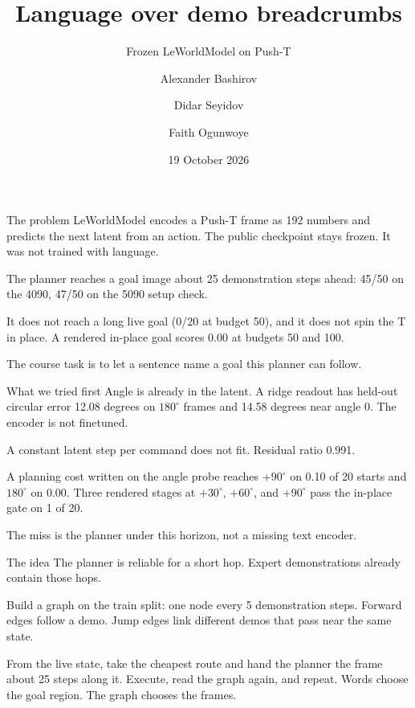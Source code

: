 \documentclass[aspectratio=169,11pt]{beamer}
\title{Language over demo breadcrumbs}
\subtitle{Frozen LeWorldModel on Push-T}
\author{Alexander Bashirov \and Didar Seyidov \and Faith Ogunwoye}
\institute{Skoltech}
\date{19 October 2026}
\begin{document}
\begin{frame}
  \titlepage
\end{frame}

\begin{frame}{The problem}
  LeWorldModel encodes a Push-T frame as 192 numbers and predicts the next latent from an action.
  The public checkpoint stays frozen. It was not trained with language.

  The planner reaches a goal image about 25 demonstration steps ahead: 45/50 on the 4090, 47/50 on the 5090 setup check.

  It does not reach a long live goal (0/20 at budget 50), and it does not spin the T in place.
  A rendered in-place goal scores 0.00 at budgets 50 and 100.

  The course task is to let a sentence name a goal this planner can follow.
\end{frame}

\begin{frame}{What we tried first}
  Angle is already in the latent.
  A ridge readout has held-out circular error 12.08 degrees on $180^{\circ}$ frames and 14.58 degrees near angle 0.
  The encoder is not finetuned.

  A constant latent step per command does not fit. Residual ratio 0.991.

  A planning cost written on the angle probe reaches $+90^{\circ}$ on 0.10 of 20 starts and $180^{\circ}$ on 0.00.
  Three rendered stages at $+30^{\circ}$, $+60^{\circ}$, and $+90^{\circ}$ pass the in-place gate on 1 of 20.

  The miss is the planner under this horizon, not a missing text encoder.
\end{frame}

\begin{frame}{The idea}
  The planner is reliable for a short hop.
  Expert demonstrations already contain those hops.

  Build a graph on the train split: one node every 5 demonstration steps.
  Forward edges follow a demo.
  Jump edges link different demos that pass near the same state.

  From the live state, take the cheapest route and hand the planner the frame about 25 steps along it.
  Execute, read the graph again, and repeat.
  Words choose the goal region. The graph chooses the frames.
\end{frame}
\end{document}
